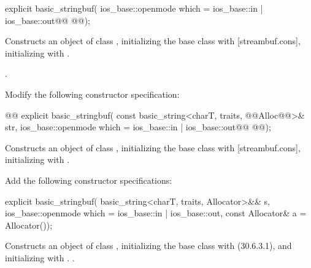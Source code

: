 \documentclass[ebook,11pt,article]{memoir}
\newcommand{\iref}[1]{[#1]}
\begin{document}
\begin{itemdecl}
explicit basic_stringbuf(
  ios_base::openmode which = ios_base::in | ios_base::out@\added{,}@
  @@);
\end{itemdecl}

\begin{itemdescr}
\pnum
\effects
Constructs an object of class
,
initializing the base class with
\iref{streambuf.cons},  initializing
with .

\pnum
\postconditions
{}.
\end{itemdescr}

Modify the following constructor specification:
\begin{itemdecl}
@@
explicit basic_stringbuf(
  const basic_string<charT, traits, @@Alloc@@>& str,
  ios_base::openmode which = ios_base::in | ios_base::out@\added{,}@
  @@);
\end{itemdecl}

\begin{itemdescr}
\pnum
\effects
Constructs an object of class
,
initializing the base class with
\iref{streambuf.cons},  initializing
with .
\end{itemdescr}

Add the following constructor specifications:

\begin{insrt}
\begin{itemdecl}
explicit basic_stringbuf(
  basic_string<charT, traits, Allocator>&& s,
  ios_base::openmode which = ios_base::in | ios_base::out,
  const Allocator\& a = Allocator());
\end{itemdecl}
\begin{itemdescr}
\pnum
\effects Constructs an object of class , initializing the base class with  (30.6.3.1), and initializing  with . 
.
\end{itemdescr}
\end{insrt}
\end{document}
